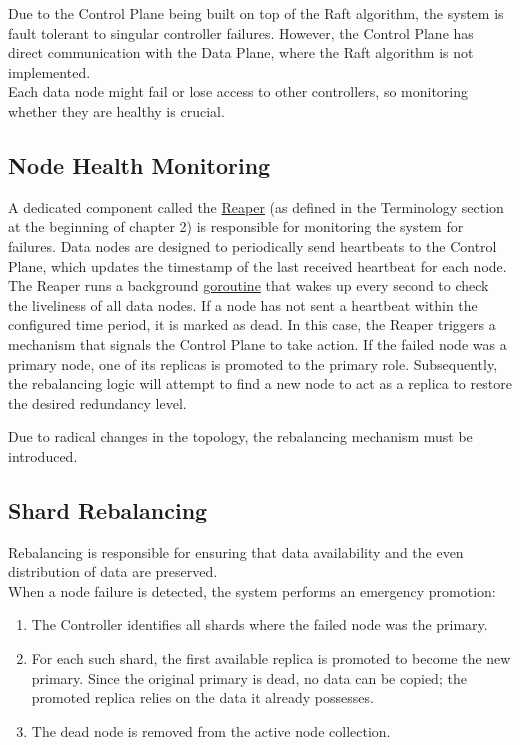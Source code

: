 \documentclass[shortabstract]{iithesis}
\begin{document}
Due to the Control Plane being built on top of the Raft algorithm, the system is fault tolerant to singular controller failures. However, the Control Plane has direct communication with the Data Plane, where the Raft algorithm is not implemented. \\
Each data node might fail or lose access to other controllers, so monitoring whether they are healthy is crucial.

\subsection{Node Health Monitoring}

A dedicated component called the \hyperref[def:reaper]{Reaper} (as defined in the Terminology section at the beginning of chapter 2) is responsible for monitoring the system for failures. Data nodes are designed to periodically send heartbeats to the Control Plane, which updates the timestamp of the last received heartbeat for each node. The Reaper runs a background \hyperref[def:goroutine]{goroutine} that wakes up every second to check the liveliness of all data nodes. If a node has not sent a heartbeat within the configured time period, it is marked as dead. In this case, the Reaper triggers a mechanism that signals the Control Plane to take action. If the failed node was a primary node, one of its replicas is promoted to the primary role. Subsequently, the rebalancing logic will attempt to find a new node to act as a replica to restore the desired redundancy level. 

Due to radical changes in the topology, the rebalancing mechanism must be introduced.

\subsection{Shard Rebalancing}
Rebalancing is responsible for ensuring that data availability and the even distribution of data are preserved. \\

\noindent When a node failure is detected, the system performs an emergency promotion:
\begin{enumerate}
    \item The Controller identifies all shards where the failed node was the primary.
    \item For each such shard, the first available replica is promoted to become the new primary. Since the original primary is dead, no data can be copied; the promoted replica relies on the data it already possesses.
    \item The dead node is removed from the active node collection.
\end{enumerate}
\end{document}
